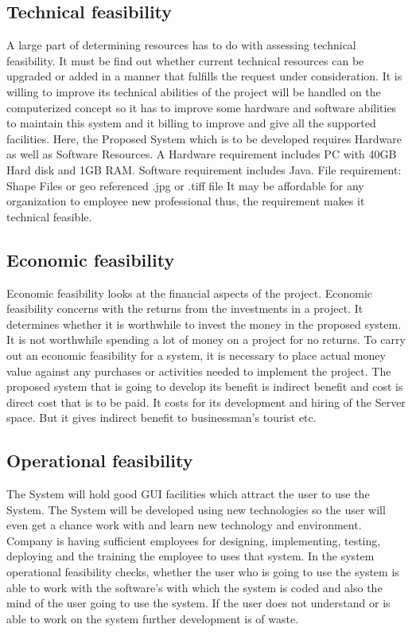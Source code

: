 \subsection{Technical feasibility}
A large part of determining resources has to do with assessing technical feasibility. It must be find out whether current technical resources can be upgraded or added in a manner that fulfills the request  under consideration. It is willing to improve its technical abilities of the project will be handled on the computerized concept so it has to improve some hardware and software abilities to maintain this system and it billing to improve and give all the supported facilities.
Here, the Proposed System which is to be developed requires Hardware as well as Software Resources.
A Hardware requirement includes PC with 40GB Hard disk and 1GB RAM.  Software requirement includes Java.
File requirement: Shape Files or geo referenced .jpg or .tiff file
It may be affordable for any organization to employee new professional thus, the requirement makes it technical feasible.

\subsection{Economic feasibility}
Economic feasibility looks at the financial aspects of the project. Economic feasibility concerns with the returns from the investments in a project. It determines whether it is worthwhile to invest the money in the proposed system. It is not worthwhile spending a lot of money on a project for no returns.
To carry out an economic feasibility for a system, it is necessary to place actual money value against any purchases or activities needed to implement the project.
The proposed system that is going to develop its benefit is indirect benefit and cost is direct cost that is to be paid. It costs for its development and hiring of the Server space. But it gives indirect benefit to businessman’s tourist etc.

\subsection{Operational feasibility}
The System will hold good GUI facilities which attract the user to use the System. The System will be developed using new technologies so the user will even get a chance work with and learn new technology and environment.
Company is having sufficient employees for designing, implementing, testing, deploying and the training the employee to uses that system.
In the system operational feasibility checks, whether the user who is going to use the system is able to work with the software’s with which the system is coded and also the mind of the user going to use the system. If the user does not understand or is able to work on the system further development is of waste.


